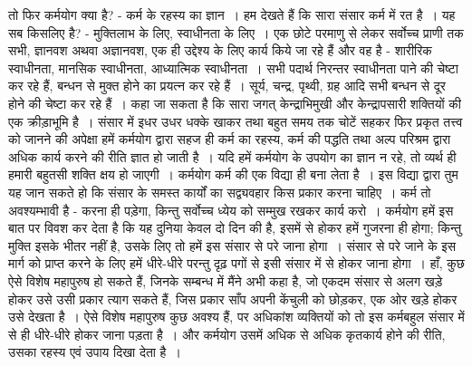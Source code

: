 तो फिर कर्मयोग क्या है? - कर्म के रहस्य का ज्ञान~। हम देखते हैं कि सारा संसार कर्म में रत है~। यह सब किसलिए है? - मुक्तिलाभ के लिए, स्वाधीनता के लिए~। एक छोटे परमाणु से लेकर सर्वोच्च प्राणी तक सभी, ज्ञानवश अथवा अज्ञानवश, एक ही उद्देश्य के लिए कार्य किये जा रहे हैं और वह है - शारीरिक स्वाधीनता, मानसिक स्वाधीनता, आध्यात्मिक स्वाधीनता~। सभी पदार्थ निरन्तर स्वाधीनता पाने की चेष्टा कर रहे हैं, बन्धन से मुक्त होने का प्रयत्न कर रहे हैं~। सूर्य, चन्द्र, पृथ्वी, ग्रह आदि सभी बन्धन से दूर होने की चेष्टा कर रहे हैं~। कहा जा सकता है कि सारा जगत् केन्द्राभिमुखी और केन्द्रापसारी शक्तियों की एक क्रीड़ाभूमि है~। संसार में इधर उधर धक्के खाकर तथा बहुत समय तक चोटें सहकर फिर प्रकृत तत्त्व को जानने की अपेक्षा हमें कर्मयोग द्वारा सहज ही कर्म का रहस्य, कर्म की पद्धति तथा अल्प परिश्रम द्वारा अधिक कार्य करने की रीति ज्ञात हो जाती है~। यदि हमें कर्मयोग के उपयोग का ज्ञान न रहे, तो व्यर्थ ही हमारी बहुतसी शक्ति क्षय हो जाएगी~। कर्मयोग कर्म की एक विद्या ही बना लेता है~। इस विद्या द्वारा तुम यह जान सकते हो कि संसार के समस्त कार्यों का सद्व्यवहार किस प्रकार करना चाहिए~। कर्म तो अवश्यम्भावी है - करना ही पड़ेगा, किन्तु सर्वोच्च ध्येय को सम्मुख रखकर कार्य करो~। कर्मयोग हमें इस बात पर विवश कर देता है कि यह दुनिया केवल दो दिन की है, इसमें से होकर हमें गुजरना ही होगा; किन्तु मुक्ति इसके भीतर नहीं है, उसके लिए तो हमें इस संसार से परे जाना होगा~। संसार से परे जाने के इस मार्ग को प्राप्त करने के लिए हमें धीरे-धीरे परन्तु दृढ़ पगों से इसी संसार में से होकर जाना होगा~। हाँ, कुछ ऐसे विशेष महापुरुष हो सकते हैं, जिनके सम्बन्ध में मैंने अभी कहा है, जो एकदम संसार से अलग खड़े होकर उसे उसी प्रकार त्याग सकते हैं, जिस प्रकार साँप अपनी केंचुली को छोड़कर, एक ओर खड़े होकर उसे देखता है~। ऐसे विशेष महापुरुष कुछ अवश्य हैं, पर अधिकांश व्यक्तियों को तो इस कर्मबहुल संसार में से ही धीरे-धीरे होकर जाना पड़ता है~। और कर्मयोग उसमें अधिक से अधिक कृतकार्य होने की रीति, उसका रहस्य एवं उपाय दिखा देता है~।

